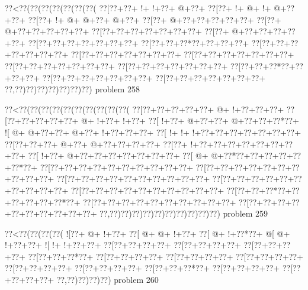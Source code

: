 \vbox{\vbox{\goo
\0??<\0??(\0??(\0??(\0??(\0??(\0??(\0??(
\0??[\0??+\0??+\- !+\- !+\0??+\- @+\0??+
\0??[\0??+\- !+\- @+\- !+\- @+\0??+\0??+
\0??[\0??+\- !+\- @+\- @+\0??+\- @+\0??+
\0??[\0??+\- @+\0??+\0??+\0??+\0??+\0??+
\0??[\0??+\- @+\0??+\0??+\0??+\0??+\0??+
\0??[\0??+\0??+\0??+\0??+\0??+\0??+\0??+
\0??[\0??+\- @+\0??+\0??+\0??+\0??+\0??+
\0??[\0??+\0??+\0??+\0??+\0??+\0??+\0??+
\0??[\0??+\0??+\0??*\0??+\0??+\0??+\0??+
\0??[\0??+\0??+\0??+\0??+\0??+\0??+\0??+
\0??[\0??+\0??+\0??+\0??+\0??+\0??+\0??+
\0??[\0??+\0??+\0??+\0??+\0??+\0??+\0??+
\0??[\0??+\0??+\0??+\0??+\0??+\0??+\0??+
\0??[\0??+\0??+\0??+\0??+\0??+\0??+\0??+
\0??[\0??+\0??+\0??*\0??+\0??+\0??+\0??+
\0??[\0??+\0??+\0??+\0??+\0??+\0??+\0??+
\0??[\0??+\0??+\0??+\0??+\0??+\0??+\0??+
\0??,\0??)\0??)\0??)\0??)\0??)\0??)\0??)
}
\hfil problem 258\hfil\break
}

\vbox{\vbox{\goo
\0??<\0??(\0??(\0??(\0??(\0??(\0??(\0??(\0??(\0??(\0??(
\0??[\0??+\0??+\0??+\0??+\0??+\- @+\- !+\0??+\0??+\0??+
\0??[\0??+\0??+\0??+\0??+\0??+\- @+\- !+\0??+\- !+\0??+
\0??[\- !+\0??+\- @+\0??+\0??+\- @+\0??+\0??+\0??*\0??+
\- ![\- @+\- @+\0??+\0??+\- @+\0??+\- !+\0??+\0??+\0??+
\0??[\- !+\- !+\- !+\0??+\0??+\0??+\0??+\0??+\0??+\0??+
\0??[\0??+\0??+\0??+\- @+\0??+\- @+\0??+\0??+\0??+\0??+
\0??[\0??+\- !+\0??+\0??+\0??+\0??+\0??+\0??+\0??+\0??+
\0??[\- !+\0??+\- @+\0??+\0??+\0??+\0??+\0??+\0??+\0??+
\0??[\- @+\- @+\0??*\0??+\0??+\0??+\0??+\0??+\0??*\0??+
\0??[\0??+\0??+\0??+\0??+\0??+\0??+\0??+\0??+\0??+\0??+
\0??[\0??+\0??+\0??+\0??+\0??+\0??+\0??+\0??+\0??+\0??+
\0??[\0??+\0??+\0??+\0??+\0??+\0??+\0??+\0??+\0??+\0??+
\0??[\0??+\0??+\0??+\0??+\0??+\0??+\0??+\0??+\0??+\0??+
\0??[\0??+\0??+\0??+\0??+\0??+\0??+\0??+\0??+\0??+\0??+
\0??[\0??+\0??+\0??*\0??+\0??+\0??+\0??+\0??+\0??*\0??+
\0??[\0??+\0??+\0??+\0??+\0??+\0??+\0??+\0??+\0??+\0??+
\0??[\0??+\0??+\0??+\0??+\0??+\0??+\0??+\0??+\0??+\0??+
\0??,\0??)\0??)\0??)\0??)\0??)\0??)\0??)\0??)\0??)\0??)
}
\hfil problem 259\hfil\break
}

\vbox{\vbox{\goo
\0??<\0??(\0??(\0??(\0??(
\- ![\0??+\- @+\- !+\0??+
\0??[\- @+\- @+\- !+\0??+
\0??[\- @+\- !+\0??*\0??+
\- @[\- @+\- !+\0??+\0??+
\- ![\- !+\- !+\0??+\0??+
\0??[\0??+\0??+\0??+\0??+
\0??[\0??+\0??+\0??+\0??+
\0??[\0??+\0??+\0??+\0??+
\0??[\0??+\0??+\0??*\0??+
\0??[\0??+\0??+\0??+\0??+
\0??[\0??+\0??+\0??+\0??+
\0??[\0??+\0??+\0??+\0??+
\0??[\0??+\0??+\0??+\0??+
\0??[\0??+\0??+\0??+\0??+
\0??[\0??+\0??+\0??*\0??+
\0??[\0??+\0??+\0??+\0??+
\0??[\0??+\0??+\0??+\0??+
\0??,\0??)\0??)\0??)\0??)
}
\hfil problem 260\hfil\break
}

